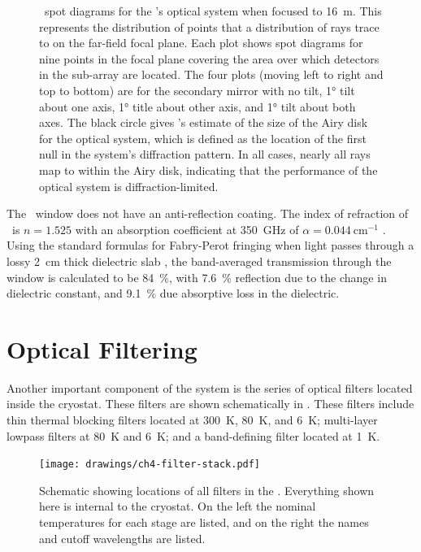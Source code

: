 \begin{figure}
\begin{tabular}{lr}
\end{tabular}
\caption[\ZEMAX\ spot diagrams]{
\ZEMAX\ spot diagrams for the \Imager's optical system when focused to \SI{16}{\m}.
This represents the distribution of points that a distribution of rays trace to on the far-field focal plane.
Each plot shows spot diagrams for nine points in the focal plane covering the area over which detectors in the sub-array are located.
The four plots (moving left to right and top to bottom) are for the secondary mirror with no tilt, \ang{1} tilt about one axis, \ang{1} title about other axis, and \ang{1} tilt about both axes.
The black circle gives \ZEMAX's estimate of the size of the Airy disk for the optical system, which is defined as the location of the first null in the system's diffraction pattern.
In all cases, nearly all rays map to within the Airy disk, indicating that the performance of the optical system is diffraction-limited.
}
\label{fig:ch4-spot-diagrams}
\end{figure}

The \HDPE\ window does not have an anti-reflection coating.
The index of refraction of \HDPE\ is $n=1.525$ with an absorption coefficient at \SI{350}{\GHz} of $\alpha = \SI{0.044}{\cm^{-1}}$ \cite{lamb_miscellaneous_1996}.
Using the standard formulas for Fabry-Perot fringing when light passes through a lossy \SI{2}{\cm} thick dielectric slab \cite[Chapter~5]{sophocles_j._ordanidis_electromagnetic_2014}, the band-averaged transmission through the window is calculated to be \SI{84}{\percent}, with \SI{7.6}{\percent} reflection due to the change in dielectric constant, and \SI{9.1}{\percent} due absorptive loss in the dielectric.

\section{Optical Filtering} \label{sec:ch4-filters}

Another important component of the system is the series of optical filters located inside the cryostat.
These filters are shown schematically in .
These filters include thin thermal blocking filters located at \SI{300}{\K}, \SI{80}{\K}, and \SI{6}{\K}; multi-layer lowpass filters at \SI{80}{\K} and \SI{6}{\K}; and a band-defining filter located at \SI{1}{\K}.

\begin{figure}
\centering
\texttt{[image: drawings/ch4-filter-stack.pdf]}
\caption[Schematic showing locations of all filters in the \Imager]{
  Schematic showing locations of all filters in the \Imager.
  Everything shown here is internal to the cryostat.
  On the left the nominal temperatures for each stage are listed, and on the right the names and cutoff wavelengths are listed.
}
\label{fig:ch4-filter-stack}
\end{figure}


